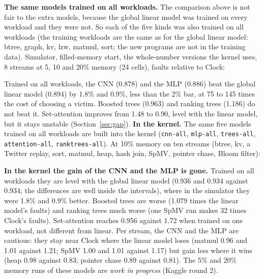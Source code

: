 \documentclass[10.5pt,a4paper]{article}
\newcommand{\code}[1]{\texttt{#1}}
\begin{document}
\textbf{The same models trained on all workloads.} The comparison above is not fair to the extra models, because the global linear model was trained on every workload and they were not.
So each of the five kinds was also trained on all workloads (the training workloads are the same as for the global linear model: btree, graph, kv, lzw, matmul, sort; the new programs
are not in the training data). Simulator, filled-memory start, the whole-number versions the kernel uses, 8 streams at 5, 10 and 20\% memory (24 cells), faults relative to Clock:

\begin{table}[h]
\centering\small

\caption{Simulator, 24 cells: geometric mean of faults relative to Clock.}
\end{table}

Trained on all workloads, the CNN (0.878) and the MLP (0.886) beat the global linear model (0.894) by 1.8\% and 0.9\%, less than the 2\% bar, at 75 to 145 times the cost of choosing a
victim. Boosted trees (0.963) and ranking trees (1.186) do not beat it. Set-attention improves from 1.48 to 0.90, level with the linear model, but it stays unstable (Section~\ref{sec:gap}).
\textbf{In the kernel.} The same five models trained on all workloads are built into the kernel (\code{cnn-all}, \code{mlp-all}, \code{trees-all}, \code{attention-all}, \code{ranktrees-all}).
At 10\% memory on ten streams (btree, kv, a Twitter replay, sort, matmul, heap, hash join, SpMV, pointer chase, Bloom filter):

\begin{table}[h]
\centering\small

\caption{xv6, 10\% memory, ten streams: faults relative to Clock (geometric mean) and the all-workloads models against the global linear model on the same streams (95\% interval from resampling the streams).}
\end{table}

\textbf{In the kernel the gain of the CNN and the MLP is gone.} Trained on all workloads they are level with the global linear model (0.936 and 0.934 against 0.934; the differences are well
inside the intervals), where in the simulator they were 1.8\% and 0.9\% better. Boosted trees are worse (1.079 times the linear model's faults) and ranking trees much worse (one SpMV run makes 32 times
Clock's faults). Set-attention reaches 0.956 against 1.72 when trained on one workload, not different from linear. Per stream, the CNN and the MLP are cautious: they stay near Clock where the linear
model loses (matmul 0.96 and 1.01 against 1.21; SpMV 1.00 and 1.01 against 1.17) but gain less where it wins (heap 0.98 against 0.83; pointer chase 0.89 against 0.81). The 5\% and 20\% memory runs of these models
are \emph{work in progress} (Kaggle round 2).
\end{document}
